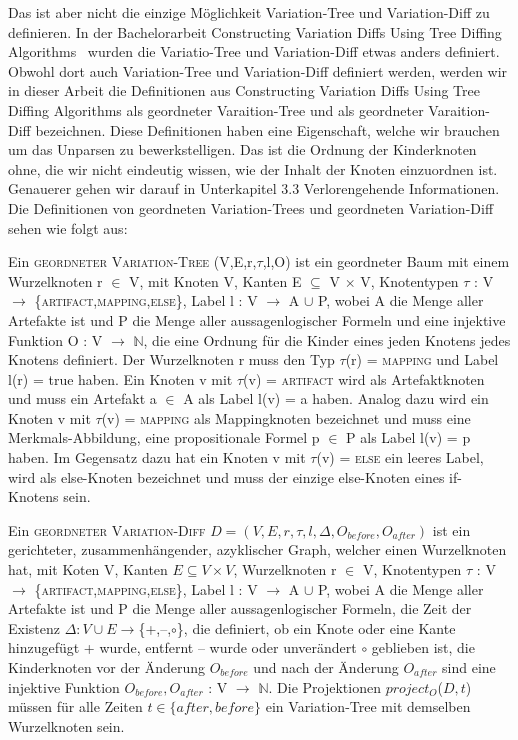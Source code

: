 Das ist aber nicht die einzige Möglichkeit Variation-Tree und Variation-Diff zu definieren. In der Bachelorarbeit  Constructing Variation Diffs Using Tree Diffing Algorithms~\cite{Moosherr23} wurden die Variatio-Tree und Variation-Diff etwas anders definiert. Obwohl dort auch Variation-Tree und Variation-Diff definiert werden, werden wir in dieser Arbeit die Definitionen aus Constructing Variation Diffs Using Tree Diffing Algorithms als geordneter Varaition-Tree und als geordneter Varaition-Diff bezeichnen. Diese Definitionen haben eine Eigenschaft, welche wir brauchen um das Unparsen zu bewerkstelligen. Das ist die Ordnung der Kinderknoten ohne, die wir nicht eindeutig wissen, wie der Inhalt der Knoten einzuordnen ist. Genauerer gehen wir darauf in Unterkapitel 3.3 Verlorengehende Informationen. Die Definitionen von geordneten Variation-Trees und geordneten Variation-Diff sehen wie folgt aus:
\begin{definition}
	Ein \textsc{geordneter Variation-Tree} (V,E,r,$\tau$,l,O) ist ein geordneter Baum mit einem Wurzelknoten r $\in$ V, mit Knoten V, Kanten E $\subseteq$ V $\times$ V, Knotentypen $\tau$ : V $\rightarrow$ \{\textsc{artifact,mapping,else}\}, Label l : V $\rightarrow$ A $\cup$ P, wobei A die Menge aller Artefakte ist und P die Menge aller aussagenlogischer Formeln und eine injektive Funktion O : V $\rightarrow$  $\mathbb{N}$, die eine Ordnung für die Kinder eines jeden Knotens jedes Knotens definiert. Der Wurzelknoten r muss den Typ $\tau$(r) = \textsc{mapping} und Label l(r) = true haben. Ein Knoten v mit $\tau$(v) = \textsc{artifact} wird als Artefaktknoten und muss ein Artefakt a $\in$ A als Label l(v) = a haben. Analog dazu wird ein Knoten v mit $\tau$(v) = \textsc{mapping} als Mappingknoten bezeichnet und muss eine Merkmals-Abbildung, eine propositionale Formel p $\in$ P als Label l(v) = p haben. Im Gegensatz dazu hat ein Knoten v mit $\tau$(v) = \textsc{else} ein leeres Label, wird als else-Knoten bezeichnet und muss der einzige else-Knoten eines if-Knotens sein. 
	
\end{definition}
	

\begin{definition}
	Ein \textsc{geordneter Variation-Diff} $D=(V,E,r,\tau,l,\Delta,O_{before},O_{after}) $ ist ein gerichteter, zusammenhängender, azyklischer Graph, welcher einen Wurzelknoten hat, mit Koten V, Kanten $E \subseteq V \times V$, Wurzelknoten r $\in$ V, Knotentypen $\tau$ : V $\rightarrow$ \{\textsc{artifact,mapping,else}\}, Label l : V $\rightarrow$ A $\cup$ P, wobei A die Menge aller Artefakte ist und P die Menge aller aussagenlogischer Formeln, die Zeit der Existenz $\Delta : V \cup E \rightarrow $\{+,--,$\circ$\}, die definiert, ob ein Knote oder eine Kante hinzugefügt + wurde, entfernt -- wurde oder unverändert $\circ$ geblieben ist, die Kinderknoten vor der Änderung $O_{before}$ und nach der Änderung $O_{after}$ sind eine injektive Funktion $O_{before},O_{after}$ : V $\rightarrow$ $\mathbb{N}$. Die Projektionen  \textsc{$project_{O}$}($D,t$) müssen für alle Zeiten  $t \in \{after,before\}$ ein Variation-Tree mit demselben Wurzelknoten sein.
	
\end{definition}


